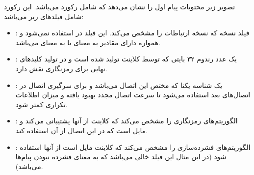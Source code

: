 \documentclass{report}
\begin{document}
تصویر زیر محتویات پیام اول را نشان می‌دهد که شامل رکورد  می‌باشد. این رکورد شامل فیلدهای زیر می‌باشد:
\begin{itemize}

\item {}:
فیلد نسخه که نسخه ارتباطات را مشخص می‌کند. این فیلد در  استفاده نمی‌شود و همواره دارای مقادیر  به معنای  یا  به معنای  می‌باشد.
\item {}:
یک عدد رندوم ۳۲ بایتی که توسط کلاینت تولید شده است و در تولید کلیدهای نهایی برای رمزنگاری نقش دارد.

\item {}:
یک شناسه یکتا که مختص این اتصال می‌باشد و برای سرگیری اتصال در اتصال‌های بعد استفاده می‌شود تا سرعت اتصال مجدد بهبود یافته و میزان اطلاعات تکراری کمتر شود.
\item {}:
الگوریتم‌های رمزنگاری را مشخص می‌کند که کلاینت از آنها پشتیبانی می‌کند و مایل است که در این اتصال از آن استفاده کند.
\item {}:
الگوریتم‌های فشرده‌سازی را مشخص می‌کند که کلاینت مایل است از آنها استفاده شود (در این مثال این فیلد خالی می‌باشد که به معنای فشرده نبودن پیام‌ها می‌باشد).

\end{itemize}
\end{document}
